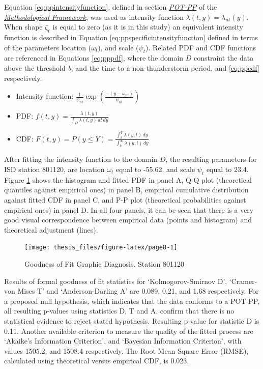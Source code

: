 \documentclass[12pt,twoside]{reedthesis}
\begin{document}
Equation \eqref{eq:ppintensityfunction}, defined in section \emph{\protect\hyperlink{method-pot-pp}{POT-PP}} of the \emph{\protect\hyperlink{rmd-thefra}{Methodological Framework}}, was used as intensity function \(\lambda(t, y) = \lambda_{nt}(y)\). When shape \(\zeta_t\) is equal to zero (as it is in this study) an equivalent intensity function is described in Equation \eqref{eq:ppspecificintensityfunction} defined in terms of the parameters location (\(\omega_t\)), and scale (\(\psi_t\)). Related PDF and CDF functions are referenced in Equations \eqref{eq:pppdf}, where the domain \(D\) constraint the data above the threshold \emph{b}, and the time to a non-thunderstorm period, and \eqref{eq:ppcdf} respectively.
\begin{itemize}
\item
  Intensity function: \(\frac{1}{\psi_{nt}}\exp\left(\frac{-(y-\omega_{nt})}{\psi_{nt}}\right)\)
\item
  PDF: \(f(t,y) = \frac{\lambda(t,y)}{\int_D\lambda(t,y)\,dt\,dy}\)
\item
  CDF: \(F(t,y) = P(y \leq Y) = \frac{\int_b^Y\lambda(y,t)\,dy}{\int_b^\infty\lambda(y,t)\,dy}\)
\end{itemize}
After fitting the intensity function to the domain \(D\), the resulting parameters for ISD station 801120, are location \(\omega_t\) equal to -55.62, and scale \(\psi_t\) equal to 23.4. Figure \ref{fig:page8} shows the histogram and fitted PDF in panel A, Q-Q plot (theoretical quantiles against empirical ones) in panel B, empirical cumulative distribution against fitted CDF in panel C, and P-P plot (theoretical probabilities against empirical ones) in panel D. In all four panels, it can be seen that there is a very good visual correspondence between empirical data (points and histogram) and theoretical adjustment (lines).
\begin{figure}

{\centering \texttt{[image: thesis\_files/figure-latex/page8-1]} 

}

\caption{Goodness of Fit Graphic Diagnosis. Station 801120}\label{fig:page8}
\end{figure}
Results of formal goodness of fit statistics for `Kolmogorov-Smirnov D', `Cramer-von Mises T' and `Anderson-Darling A' are 0.089, 0.21, and 1.68 respectively. For a proposed null hypothesis, which indicates that the data conforms to a POT-PP, all resulting p-values using statistics D, T and A, confirm that there is no statistical evidence to reject stated hypothesis. Resulting p-value for statistic D is 0.11. Another available criterion to measure the quality of the fitted process are `Akaike's Information Criterion', and `Bayesian Information Criterion', with values 1505.2, and 1508.4 respectively. The Root Mean Square Error (RMSE), calculated using theoretical versus empirical CDF, is 0.023.
\end{document}
